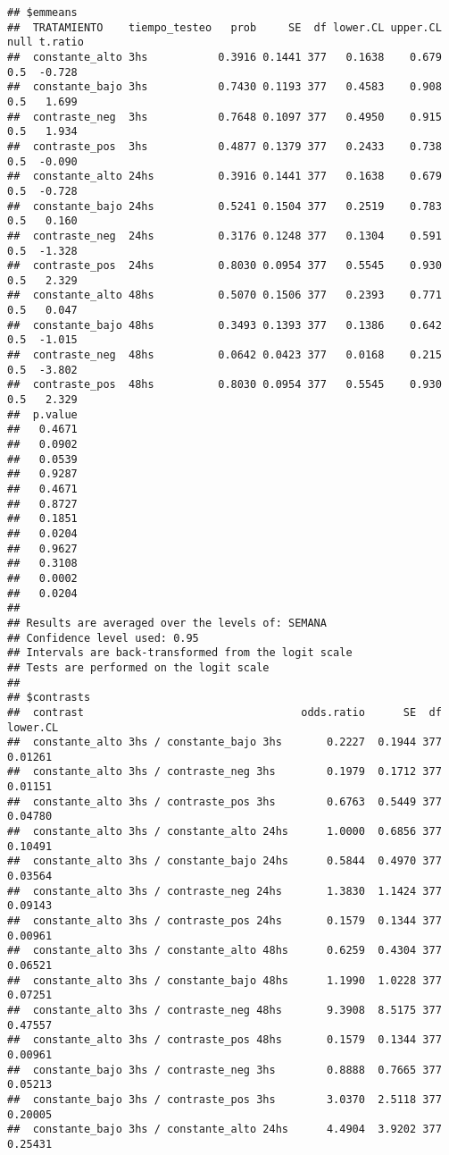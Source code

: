 \documentclass[
]{article}
\begin{document}
\begin{verbatim}
## $emmeans
##  TRATAMIENTO    tiempo_testeo   prob     SE  df lower.CL upper.CL null t.ratio
##  constante_alto 3hs           0.3916 0.1441 377   0.1638    0.679  0.5  -0.728
##  constante_bajo 3hs           0.7430 0.1193 377   0.4583    0.908  0.5   1.699
##  contraste_neg  3hs           0.7648 0.1097 377   0.4950    0.915  0.5   1.934
##  contraste_pos  3hs           0.4877 0.1379 377   0.2433    0.738  0.5  -0.090
##  constante_alto 24hs          0.3916 0.1441 377   0.1638    0.679  0.5  -0.728
##  constante_bajo 24hs          0.5241 0.1504 377   0.2519    0.783  0.5   0.160
##  contraste_neg  24hs          0.3176 0.1248 377   0.1304    0.591  0.5  -1.328
##  contraste_pos  24hs          0.8030 0.0954 377   0.5545    0.930  0.5   2.329
##  constante_alto 48hs          0.5070 0.1506 377   0.2393    0.771  0.5   0.047
##  constante_bajo 48hs          0.3493 0.1393 377   0.1386    0.642  0.5  -1.015
##  contraste_neg  48hs          0.0642 0.0423 377   0.0168    0.215  0.5  -3.802
##  contraste_pos  48hs          0.8030 0.0954 377   0.5545    0.930  0.5   2.329
##  p.value
##   0.4671
##   0.0902
##   0.0539
##   0.9287
##   0.4671
##   0.8727
##   0.1851
##   0.0204
##   0.9627
##   0.3108
##   0.0002
##   0.0204
## 
## Results are averaged over the levels of: SEMANA 
## Confidence level used: 0.95 
## Intervals are back-transformed from the logit scale 
## Tests are performed on the logit scale 
## 
## $contrasts
##  contrast                                  odds.ratio      SE  df lower.CL
##  constante_alto 3hs / constante_bajo 3hs       0.2227  0.1944 377  0.01261
##  constante_alto 3hs / contraste_neg 3hs        0.1979  0.1712 377  0.01151
##  constante_alto 3hs / contraste_pos 3hs        0.6763  0.5449 377  0.04780
##  constante_alto 3hs / constante_alto 24hs      1.0000  0.6856 377  0.10491
##  constante_alto 3hs / constante_bajo 24hs      0.5844  0.4970 377  0.03564
##  constante_alto 3hs / contraste_neg 24hs       1.3830  1.1424 377  0.09143
##  constante_alto 3hs / contraste_pos 24hs       0.1579  0.1344 377  0.00961
##  constante_alto 3hs / constante_alto 48hs      0.6259  0.4304 377  0.06521
##  constante_alto 3hs / constante_bajo 48hs      1.1990  1.0228 377  0.07251
##  constante_alto 3hs / contraste_neg 48hs       9.3908  8.5175 377  0.47557
##  constante_alto 3hs / contraste_pos 48hs       0.1579  0.1344 377  0.00961
##  constante_bajo 3hs / contraste_neg 3hs        0.8888  0.7665 377  0.05213
##  constante_bajo 3hs / contraste_pos 3hs        3.0370  2.5118 377  0.20005
##  constante_bajo 3hs / constante_alto 24hs      4.4904  3.9202 377  0.25431

\end{verbatim}
\end{document}
